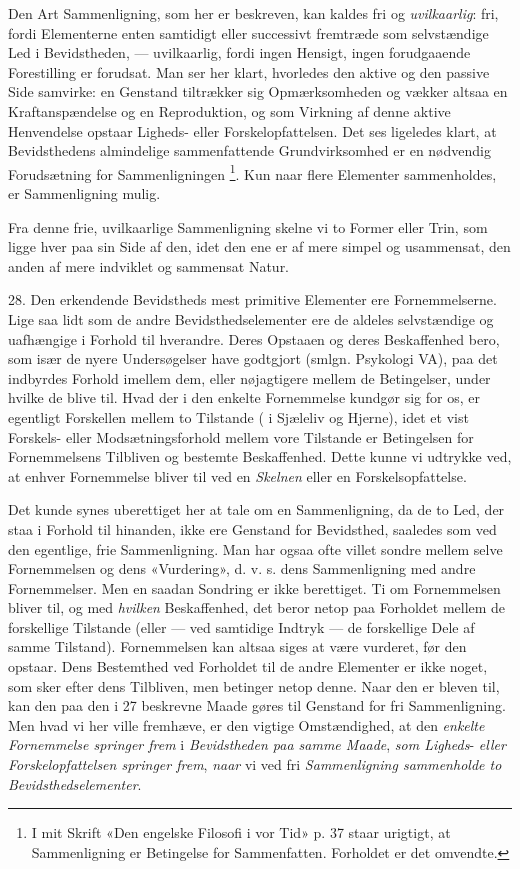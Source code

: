 \documentclass[12pt,a4paper,openany]{book}
\newcommand{\opage}[1]{\marginnote{\footnotesize\textit{[#1]}}}
\begin{document}
Den Art Sammenligning, som her er beskreven, kan kaldes fri og
\emph{uvilkaarlig}: fri, fordi Elementerne enten samtidigt eller successivt
fremtræde som selvstændige Led i Bevidstheden, --- uvilkaarlig, fordi ingen
Hensigt, ingen forudgaaende Forestilling er forudsat. Man ser her klart,
hvorledes den aktive og den passive Side samvirke: en Genstand tiltrækker sig
Opmærksomheden og vækker altsaa en Kraftanspændelse og en Reproduktion, og som
Virkning af denne aktive Henvendelse opstaar Ligheds- eller Forskelopfattelsen.
Det ses ligeledes klart, at Bevidsthedens almindelige sammenfattende
Grundvirksomhed er en nødvendig Forudsætning for Sammenligningen%
\footnote[1]{I mit Skrift «Den engelske Filosofi i vor Tid» p. 37 staar
urigtigt, at Sammenligning er Betingelse for Sammenfatten. Forholdet er det
omvendte.}. Kun naar flere Elementer sammenholdes, er Sammenligning mulig.

Fra denne frie, uvilkaarlige Sammenligning skelne vi to Former eller Trin, som
ligge hver paa sin Side af den, idet den ene er af mere simpel og usammensat,
den anden af mere indviklet og sammensat Natur.

28. Den erkendende Bevidstheds mest primitive Elementer ere Fornemmelserne.
Lige saa lidt som de andre Bevidsthedselementer ere de aldeles selvstændige og
uafhængige i Forhold til hverandre. Deres Opstaaen og deres Beskaffenhed bero,
som især de nyere Undersøgelser have godtgjort (smlgn. Psykologi VA), paa det
indbyrdes Forhold imellem dem, eller nøjagtigere mellem de Betingelser, under
hvilke de blive til. Hvad der i den enkelte Fornemmelse kundgør sig for os, er
egentligt Forskellen mellem to Tilstande (
\setcounter{footnote}{0}%
\opage{63}i Sjæleliv og Hjerne), idet et vist Forskels- eller
Modsætningsforhold mellem vore Tilstande er Betingelsen for Fornemmelsens
Tilbliven og bestemte Beskaffenhed. Dette kunne vi udtrykke ved, at enhver
Fornemmelse bliver til ved en \emph{Skelnen} eller en Forskelsopfattelse.

Det kunde synes uberettiget her at tale om en Sammenligning, da de to Led, der
staa i Forhold til hinanden, ikke ere Genstand for Bevidsthed, saaledes som ved
den egentlige, frie Sammenligning. Man har ogsaa ofte villet sondre mellem
selve Fornemmelsen og dens «Vurdering», d. v. s. dens Sammenligning med andre
Fornemmelser. Men en saadan Sondring er ikke berettiget. Ti om Fornemmelsen
bliver til, og med \emph{hvilken} Beskaffenhed, det beror netop paa Forholdet
mellem de forskellige Tilstande (eller --- ved samtidige Indtryk --- de
forskellige Dele af samme Tilstand). Fornemmelsen kan altsaa siges at være
vurderet, før den opstaar. Dens Bestemthed ved Forholdet til de andre Elementer
er ikke noget, som sker efter dens Tilbliven, men betinger netop denne. Naar
den er bleven til, kan den paa den i 27 beskrevne Maade gøres til Genstand for
fri Sammenligning. Men hvad vi her ville fremhæve, er den vigtige Omstændighed,
at den \emph{enkelte Fornemmelse springer frem} i \emph{Bevidstheden paa samme
Maade}, \emph{som Ligheds}- \emph{eller Forskelopfattelsen springer frem},
\emph{naar} vi ved fri \emph{Sammenligning sammenholde to Bevidsthedselementer}.
\end{document}
